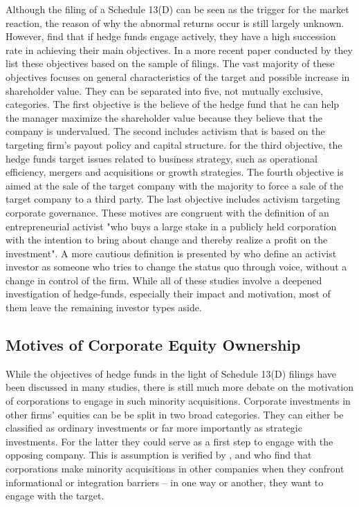 \documentclass[12pt]{article}
\begin{document}
Although the filing of a Schedule 13(D) can be seen as the trigger for the market reaction, the reason of why the abnormal returns occur is still largely unknown. However, \citet{Brav2008} find that if hedge funds engage actively, they have a high succession rate in achieving their main objectives. In a more recent paper conducted by \citet[p.12]{Brav2009} they list these objectives based on the sample of filings. The vast majority of these objectives focuses on general characteristics of the target and possible increase in shareholder value. They can be separated into five, not mutually exclusive, categories. The first objective is the believe of the hedge fund that he can help the manager maximize the shareholder value because they believe that the company is undervalued. The second includes activism that is based on the targeting firm's payout policy and capital structure. for the third objective, the hedge funds target issues related to business strategy, such as operational efficiency, mergers and acquisitions or growth strategies. The fourth objective is aimed at the sale of the target company with the majority to force a sale of the target company to a third party. The last objective includes activism targeting corporate governance. These motives are congruent with the \citet{Klein2009} definition of an entrepreneurial activist "who buys a large stake in a publicly held corporation with the intention to bring about change and thereby realize a profit on the investment". A more cautious definition is presented by \citet{Greenwood2009} who define an activist investor as someone who tries to change the status quo through voice, without a change in control of the firm. While all of these studies involve a deepened investigation of hedge-funds, especially their impact and motivation, most of them leave the remaining investor types aside.

\subsection{Motives of Corporate Equity Ownership}
While the objectives of hedge funds in the light of Schedule 13(D) filings  have been discussed in many studies, there is still much more debate on the motivation of corporations to engage in such minority acquisitions. 
Corporate investments in other firms' equities can be be split in two broad categories. They can either be classified as ordinary investments or far more importantly as strategic investments. For the latter they could serve as a first step to engage with the opposing company. This is assumption is verified by \citet{Allen2000}, \citet{Ouimet2013} and \citet{Huang2017} who find that corporations make minority acquisitions in other companies when they confront informational or integration barriers -- in one way or another, they want to engage with the target.
\end{document}
